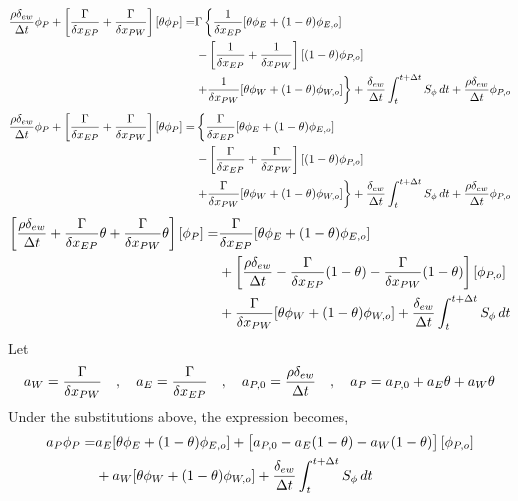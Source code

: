 \documentclass[a4paper, 12pt]{report}
\begin{document}
\begin{center}
\begin{equation*}
\begin{split}
\frac{\rho\delta_{ew}}{\Delta t}\phi_{P} + \left[\frac{\Gamma}{\delta x_{EP}} + \frac{\Gamma}{\delta x_{PW}}\right][\theta\phi_{P}] = & \Gamma \left\{\frac{1}{\delta x_{EP}}[\theta\phi_{E} + (1-\theta)\phi_{E,o}]\right.\\ & \left. - \left[\frac{1}{\delta x_{EP}} + \frac{1}{\delta x_{PW}}\right][(1-\theta)\phi_{P,o}] \right.\\ & \left.  + \frac{1}{\delta x_{PW}}[\theta\phi_{W} + (1-\theta)\phi_{W,o}]\right\} + \frac{\delta_{ew}}{\Delta t}\int^{t+\Delta t}_{t} S_\phi\,dt + \frac{\rho\delta_{ew}}{\Delta t}\phi_{P,o} 
\end{split}
\end{equation*}
\begin{equation*}
\begin{split}
\frac{\rho\delta_{ew}}{\Delta t}\phi_{P} + \left[\frac{\Gamma}{\delta x_{EP}} + \frac{\Gamma}{\delta x_{PW}}\right][\theta\phi_{P}] = & \left\{\frac{\Gamma }{\delta x_{EP}}[\theta\phi_{E} + (1-\theta)\phi_{E,o}]\right.\\ & \left. - \left[\frac{\Gamma }{\delta x_{EP}} + \frac{\Gamma }{\delta x_{PW}}\right][(1-\theta)\phi_{P,o}] \right.\\ & \left.  + \frac{\Gamma }{\delta x_{PW}}[\theta\phi_{W} + (1-\theta)\phi_{W,o}]\right\} + \frac{\delta_{ew}}{\Delta t}\int^{t+\Delta t}_{t} S_\phi\,dt + \frac{\rho\delta_{ew}}{\Delta t}\phi_{P,o} 
\end{split}
\end{equation*}
\begin{equation*}
\begin{split}
\left[\frac{\rho\delta_{ew}}{\Delta t} + \frac{\Gamma}{\delta x_{EP}}\theta + \frac{\Gamma}{\delta x_{PW}}\theta\right][\phi_{P}] = & \frac{\Gamma }{\delta x_{EP}}[\theta\phi_{E} + (1-\theta)\phi_{E,o}]\\ & +\left[\frac{\rho\delta_{ew}}{\Delta t} - \frac{\Gamma }{\delta x_{EP}}(1-\theta) - \frac{\Gamma }{\delta x_{PW}}(1-\theta)\right][\phi_{P,o}] \\ &  + \frac{\Gamma }{\delta x_{PW}}[\theta\phi_{W} + (1-\theta)\phi_{W,o}] + \frac{\delta_{ew}}{\Delta t}\int^{t+\Delta t}_{t} S_\phi\,dt 
\end{split}
\end{equation*}
Let 
$$a_W = \frac{\Gamma}{\delta x_{PW}} \quad,\quad a_E = \frac{\Gamma}{\delta x_{EP}} \quad,\quad a_{P,0} = \frac{\rho\delta_{ew}}{\Delta t} \quad,\quad a_{P} = a_{P,0} + a_E\theta + a_W\theta$$
Under the substitutions above, the expression becomes,
\begin{equation*}
\begin{split}
a_P\phi_{P} = & a_E[\t\phi_{E} + (1-\t)\phi_{E,o}] + \l[a_{P,0} - a_E(1-\t) - a_W(1-\t)\r][\phi_{P,o}] \\ & + a_W[\t\phi_{W} + (1-\t)\phi_{W,o}] + \f{\delta_{ew}}{\Delta t}\int^{t+\Delta t}_{t} S_\phi\,dt 

\end{split}
\end{equation*}
\end{center}
\end{document}
